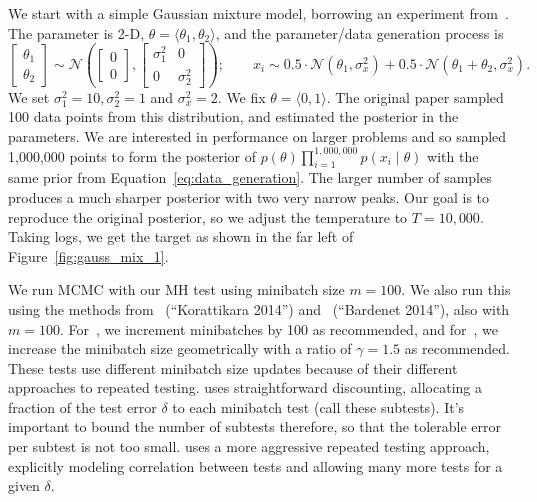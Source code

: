 \documentclass{article}
\begin{document}
We start with a simple Gaussian mixture model, borrowing an experiment
from~\cite{langevin_2011}.  The parameter is 2-D, $\theta =
\langle \theta_1,\theta_2 \rangle$, and the parameter/data generation process is
\begin{equation}\label{eq:data_generation}
    \begin{bmatrix} \theta_1 \\ \theta_2 \end{bmatrix} 
    \sim \mathcal{N}\left(\begin{bmatrix}0 \\ 0\end{bmatrix}, 
    \begin{bmatrix} \sigma_1^2 & 0 \\ 0 & \sigma_2^2\end{bmatrix} \right);\quad \quad x_i \sim
    0.5 \cdot \mathcal{N}(\theta_1, \sigma_x^2) + 0.5 \cdot \mathcal{N}(\theta_1+\theta_2, \sigma_x^2).
\end{equation}
We set $\sigma_1^2 = 10, \sigma_2^2 = 1$ and $\sigma_x^2=2$.  We fix $\theta =
\langle 0,1 \rangle$. The original paper sampled 100 data points from this
distribution, and estimated the posterior in the parameters. We are interested
in performance on larger problems and so sampled 1,000,000 points to form the
posterior of $p(\theta)\prod_{i=1}^{1,000,000}p(x_i\mid \theta)$ with the same
prior from Equation~\ref{eq:data_generation}. The larger number of samples
produces a much sharper posterior with two very narrow peaks.  Our goal is to
reproduce the original posterior, so we adjust the temperature to $T=10,000$.
Taking logs, we get the target as shown in the far left of
Figure~\ref{fig:gauss_mix_1}.

We run MCMC with our MH test using minibatch size $m=100$.  We also run this
using the methods from~\cite{cutting_mh_2014} (``Korattikara 2014'')
and~\cite{icml2014c1_bardenet14} (``Bardenet 2014''), also with $m=100$.
For~\cite{cutting_mh_2014}, we increment minibatches by 100 as recommended, and
for~\cite{icml2014c1_bardenet14}, we increase the minibatch size geometrically
with a ratio of $\gamma = 1.5$ as recommended. These tests use different
minibatch size updates because of their different approaches to repeated
testing. \cite{icml2014c1_bardenet14} uses straightforward discounting,
allocating a fraction of the test error $\delta$ to each minibatch test (call
these subtests). It's important to bound the number of subtests therefore, so
that the tolerable error per subtest is not too small.  \cite{cutting_mh_2014}
uses a more aggressive repeated testing approach, explicitly modeling
correlation between tests and allowing many more tests for a given $\delta$. 
\end{document}
